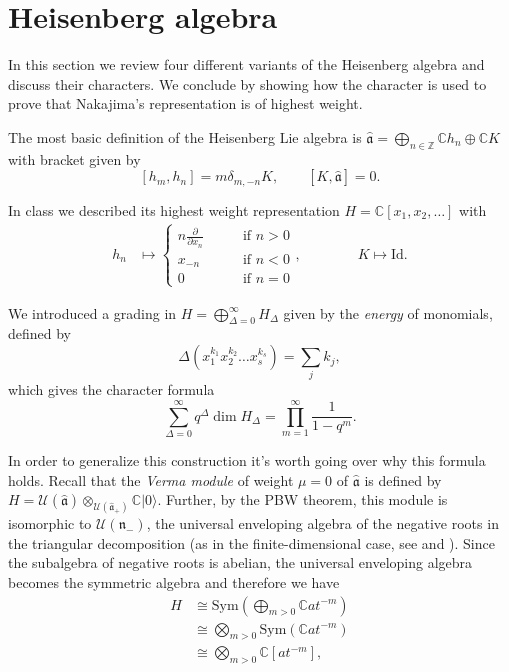 \section{Heisenberg algebra}
\label{section-heisenberg}

\noindent
In this section we review four different variants
of the Heisenberg algebra and discuss their characters.
We conclude by showing how the character is used
to prove that Nakajima's representation is
of highest weight.

\medskip\noindent
The most basic definition of the Heisenberg Lie algebra is
$\hat{\mathfrak{a}}=
\bigoplus_{n \in \mathbb{Z}} \mathbb{C}h_n \oplus\mathbb{C}K$
with bracket given by 
\begin{equation}
\label{equation-bracket-basic}
[h_m,h_n]=m\delta_{m,-n}K,\qquad 
[K,\hat{\mathfrak{a}}]=0.
\end{equation}

\noindent
In class we described its highest weight representation
$H=\mathbb{C}[x_1,x_2,\ldots]$ with
\begin{align*}
h_n&\mapsto \begin{cases}
n \frac{\partial }{\partial x_n}\qquad &\text{if }n>0\\
x_{-n}\qquad &\text{if }n<0\\
0\qquad &\text{if }n=0
\end{cases},
\qquad \qquad  K\mapsto \text{Id}.
\end{align*}

\noindent
We introduced a grading in $H=\bigoplus_{\Delta=0}^\infty H_\Delta$ 
given by the {\it energy} of monomials, defined by
$$
\Delta(x_1^{k_1}x_2^{k_2}\ldots x_s^{k_s})=\sum_j k_j,
$$
which gives the character formula
\begin{equation}
\label{equation-character-heisenberg}
\sum_{\Delta=0}^\infty q^\Delta \dim H_\Delta
=\prod_{m=1}^\infty\frac{1}{1-q^m}.
\end{equation}

\noindent
In order to generalize this construction
it's worth going over why this formula holds.
Recall that the \textit{Verma module} of
weight $\mu=0$
of $\hat{\mathfrak{a}}$ is defined by
$H=
\mathcal{U}(\hat{\mathfrak{a}})
\otimes_{\mathcal{U}(\hat{\mathfrak{a}}_+)}
\mathbb{C}|0\rangle$.
Further, by the PBW theorem, this module
is isomorphic to $\mathcal{U}(\mathfrak{n}_-)$,
the universal enveloping algebra
of the negative roots in the triangular decomposition
(as in the finite-dimensional case, see \cite[Lecture 24]{KLAL} and
\cite[Video 8]{videos}).
Since the subalgebra of negative roots is abelian,
the universal enveloping algebra becomes the symmetric algebra
and therefore we have
\begin{equation}
\label{equation-symmetric-rank-1}
\begin{aligned}
H&\cong\text{Sym}\left(\bigoplus_{m>0}\mathbb{C}at^{-m}\right)\\
&\cong\bigotimes_{m>0}\text{Sym}(\mathbb{C}at^{-m})\\
&\cong \bigotimes_{m>0}\mathbb{C}[at^{-m}],
\end{aligned}
\end{equation}

